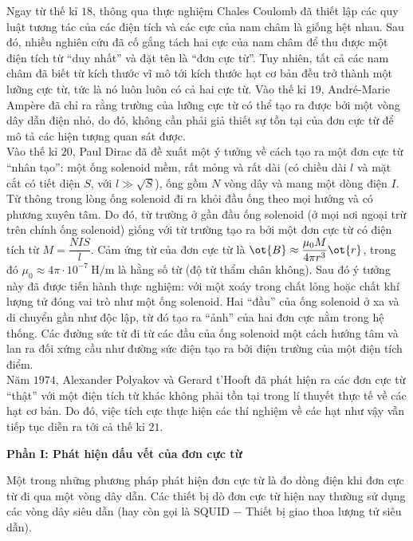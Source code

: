 \begin{vd}
Ngay từ thế kỉ $18$, thông qua thực nghiệm Chales Coulomb đã thiết lập các quy luật tương tác của các điện tích và các cực của nam châm là giống hệt nhau. Sau đó, nhiều nghiên cứu đã cố gắng tách hai cực của nam châm để thu được một điện tích từ ``duy nhất'' và đặt tên là ``đơn cực từ''. Tuy nhiên, tất cả các nam châm đã biết từ kích thước vĩ mô tới kích thước hạt cơ bản đều trở thành một lưỡng cực từ, tức là nó luôn luôn có cả hai cực từ. Vào thế kỉ $19$, André-Marie Ampère đã chỉ ra rằng trường của lưỡng cực từ có thể tạo ra được bởi một vòng dây dẫn điện nhỏ, do đó, không cần phải giả thiết sự tồn tại của đơn cực từ để mô tả các hiện tượng quan sát được.\\
Vào thế kỉ $20$, Paul Dirac đã đề xuất một ý tưởng về cách tạo ra một đơn cực từ ``nhân tạo'': một ống solenoid mềm, rất mỏng và rất dài (có chiều dài $l$ và mặt cắt có tiết diện $S$, với $l\gg \sqrt{S}$), ống gồm $N$ vòng dây và mang một dòng điện $I$. Từ thông trong lòng ống solenoid đi ra khỏi đầu ống theo mọi hướng và có phương xuyên tâm. Do đó, từ trường ở gần đầu ống solenoid (ở mọi nơi ngoại trừ trên chính ống solenoid) giống với từ trường tạo ra bởi một đơn cực từ có điện tích từ $M=\dfrac{NIS}{l}$. Cảm ứng từ của đơn cực từ là $\ot{B}\approx \dfrac{\mu_0M}{4\pi r^3}\ot{r}$, trong đó $\mu_0\approx4\pi\cdot 10^{-7} ~\mathrm{H/m}$ là hằng số từ (độ từ thẩm chân không). Sau đó ý tưởng này đã được tiến hành thực nghiệm: với một xoáy trong chất lỏng hoặc chất khí lượng tử đóng vai trò như một ống solenoid. Hai ``đầu'' của ống solenoid ở xa và di chuyển gần như độc lập, từ đó tạo ra ``ảnh'' của hai đơn cực nằm trong hệ thống. Các đường sức từ đi từ các đầu của ống solenoid một cách hướng tâm và lan ra đối xứng cầu như đường sức điện tạo ra bởi điện trường của một điện tích điểm.\\
Năm $1974$, Alexander Polyakov và Gerard t'Hooft đã phát hiện ra các đơn cực từ ``thật'' với một điện tích từ khác không phải tồn tại trong lí thuyết thực tế về các hạt cơ bản. Do đó, việc tích cực thực hiện các thí nghiệm về các hạt như vậy vẫn tiếp tục diễn ra tới cả thế kỉ $21$.\\
\begin{center}
    \textbf{Phần I: Phát hiện dấu vết của đơn cực từ}
\end{center}
Một trong những phương pháp phát hiện đơn cực từ là đo dòng điện khi đơn cực từ đi qua một vòng dây dẫn. Các thiết bị dò đơn cực từ hiện nay thường sử dụng các vòng dây siêu dẫn (hay còn gọi là SQUID $-$ Thiết bị giao thoa lượng tử siêu dẫn).

\end{vd}
